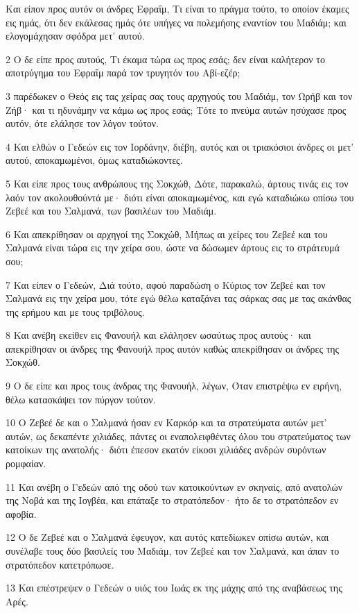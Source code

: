 \par Και είπον προς αυτόν οι άνδρες Εφραΐμ, Τι είναι το πράγμα τούτο, το οποίον έκαμες εις ημάς, ότι δεν εκάλεσας ημάς ότε υπήγες να πολεμήσης εναντίον του Μαδιάμ; και ελογομάχησαν σφόδρα μετ' αυτού.
\par 2 Ο δε είπε προς αυτούς, Τι έκαμα τώρα ως προς εσάς; δεν είναι καλήτερον το αποτρύγημα του Εφραΐμ παρά τον τρυγητόν του Αβί-εζέρ;
\par 3 παρέδωκεν ο Θεός εις τας χείρας σας τους αρχηγούς του Μαδιάμ, τον Ωρήβ και τον Ζήβ· και τι ηδυνάμην να κάμω ως προς εσάς; Τότε το πνεύμα αυτών ησύχασε προς αυτόν, ότε ελάλησε τον λόγον τούτον.
\par 4 Και ελθών ο Γεδεών εις τον Ιορδάνην, διέβη, αυτός και οι τριακόσιοι άνδρες οι μετ' αυτού, αποκαμωμένοι, όμως καταδιώκοντες.
\par 5 Και είπε προς τους ανθρώπους της Σοκχώθ, Δότε, παρακαλώ, άρτους τινάς εις τον λαόν τον ακολουθούντά με· διότι είναι αποκαμωμένος, και εγώ καταδιώκω οπίσω του Ζεβεέ και του Σαλμανά, των βασιλέων του Μαδιάμ.
\par 6 Και απεκρίθησαν οι αρχηγοί της Σοκχώθ, Μήπως αι χείρες του Ζεβεέ και του Σαλμανά είναι τώρα εις την χείρα σου, ώστε να δώσωμεν άρτους εις το στράτευμά σου;
\par 7 Και είπεν ο Γεδεών, Διά τούτο, αφού παραδώση ο Κύριος τον Ζεβεέ και τον Σαλμανά εις την χείρα μου, τότε εγώ θέλω καταξάνει τας σάρκας σας με τας ακάνθας της ερήμου και με τους τριβόλους.
\par 8 Και ανέβη εκείθεν εις Φανουήλ και ελάλησεν ωσαύτως προς αυτούς· και απεκρίθησαν οι άνδρες της Φανουήλ προς αυτόν καθώς απεκρίθησαν οι άνδρες της Σοκχώθ.
\par 9 Ο δε είπε και προς τους άνδρας της Φανουήλ, λέγων, Όταν επιστρέψω εν ειρήνη, θέλω κατασκάψει τον πύργον τούτον.
\par 10 Ο Ζεβεέ δε και ο Σαλμανά ήσαν εν Καρκόρ και τα στρατεύματα αυτών μετ' αυτών, ως δεκαπέντε χιλιάδες, πάντες οι εναπολειφθέντες όλου του στρατεύματος των κατοίκων της ανατολής· διότι έπεσον εκατόν είκοσι χιλιάδες ανδρών συρόντων ρομφαίαν.
\par 11 Και ανέβη ο Γεδεών από της οδού των κατοικούντων εν σκηναίς, από ανατολών της Νοβά και της Ιογβέα, και επάταξε το στρατόπεδον· ήτο δε το στρατόπεδον εν αφοβία.
\par 12 Ο δε Ζεβεέ και ο Σαλμανά έφευγον, και αυτός κατεδίωκεν οπίσω αυτών, και συνέλαβε τους δύο βασιλείς του Μαδιάμ, τον Ζεβεέ και τον Σαλμανά, και άπαν το στρατόπεδον κατετρόπωσε.
\par 13 Και επέστρεψεν ο Γεδεών ο υιός του Ιωάς εκ της μάχης από της αναβάσεως της Αρές.
